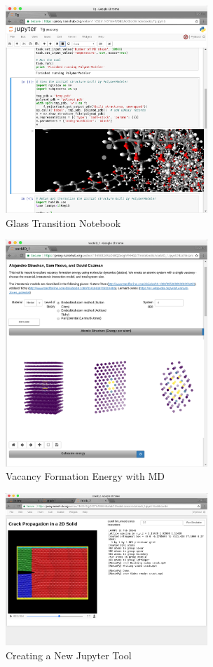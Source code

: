 \documentclass[conference]{../sty/IEEEtran}
\begin{document}
\begin{figure}[!h]
  \includegraphics[width=3in]{tgnb}
  \caption{Glass Transition Notebook \cite{tg}}
  \label{fig_tg}
\end{figure}

\begin{figure}[!h]
  \includegraphics[width=3in]{mdvacancy}
  \caption{Vacancy Formation Energy with MD \cite{mdvacancy}}
  \label{fig_mdvacancy}
\end{figure}

\begin{figure}[!h]
  \includegraphics[width=3in]{crack}
  \caption{Creating a New Jupyter Tool}
  \label{fig_crack}
\end{figure}
\end{document}
